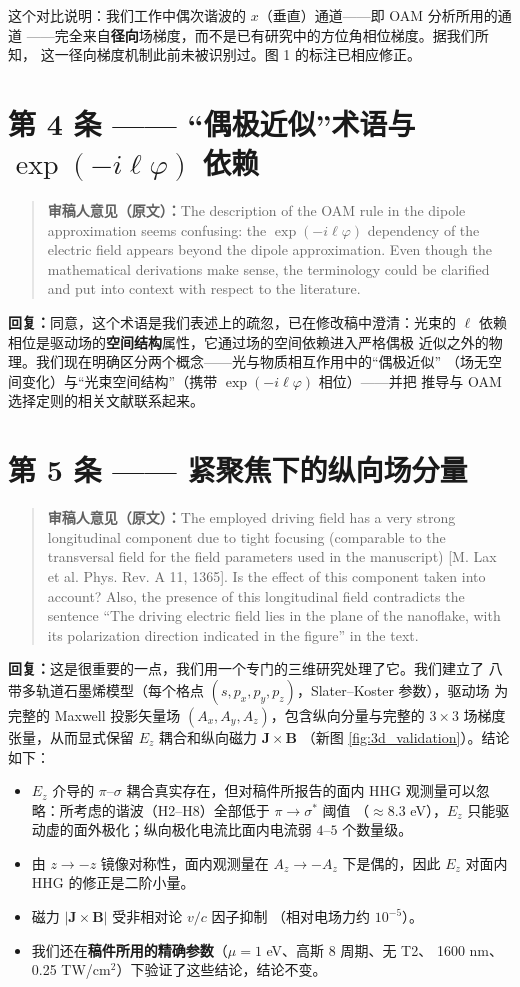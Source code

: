 \documentclass[11pt,a4paper]{ctexart}
\newcommand{\reviewer}[1]{\par\medskip\begin{quote}\small\color{gray!70!black}%
  \textbf{审稿人意见（原文）：}#1\end{quote}\medskip}
\newcommand{\response}{\par\medskip\textbf{回复：}}
\begin{document}
这个对比说明：我们工作中偶次谐波的 $x$（垂直）通道——即 OAM 分析所用的通道
——完全来自\textbf{径向}场梯度，而不是已有研究中的方位角相位梯度。据我们所知，
这一径向梯度机制此前未被识别过。图 1 的标注已相应修正。

\section*{第 4 条 —— ``偶极近似''术语与 $\exp(-i\ell\varphi)$ 依赖}

\reviewer{The description of the OAM rule in the dipole approximation seems
confusing: the $\exp(-i\ell\varphi)$ dependency of the electric field appears
beyond the dipole approximation. Even though the mathematical derivations make
sense, the terminology could be clarified and put into context with respect to
the literature.}

\response 同意，这个术语是我们表述上的疏忽，已在修改稿中澄清：光束的
$\ell$ 依赖相位是驱动场的\textbf{空间结构}属性，它通过场的空间依赖进入严格偶极
近似之外的物理。我们现在明确区分两个概念——光与物质相互作用中的``偶极近似''
（场无空间变化）与``光束空间结构''（携带 $\exp(-i\ell\varphi)$ 相位）——并把
推导与 OAM 选择定则的相关文献联系起来。

\section*{第 5 条 —— 紧聚焦下的纵向场分量}

\reviewer{The employed driving field has a very strong longitudinal component due
to tight focusing (comparable to the transversal field for the field parameters
used in the manuscript) [M. Lax et al. Phys. Rev. A 11, 1365]. Is the effect of
this component taken into account? Also, the presence of this longitudinal field
contradicts the sentence ``The driving electric field lies in the plane of the
nanoflake, with its polarization direction indicated in the figure'' in the text.}

\response 这是很重要的一点，我们用一个专门的三维研究处理了它。我们建立了
八带多轨道石墨烯模型（每个格点 $(s,p_x,p_y,p_z)$，Slater--Koster 参数），驱动场
为完整的 Maxwell 投影矢量场 $(A_x,A_y,A_z)$，包含纵向分量与完整的 $3\times3$
场梯度张量，从而显式保留 $E_z$ 耦合和纵向磁力 $\mathbf{J}\times\mathbf{B}$
（新图 \ref{fig:3d_validation}）。结论如下：

\begin{itemize}
  \item $E_z$ 介导的 $\pi$--$\sigma$ 耦合真实存在，但对稿件所报告的面内 HHG
  观测量可以忽略：所考虑的谐波（H2--H8）全部低于 $\pi\to\sigma^*$ 阈值
  （$\approx 8.3$ eV），$E_z$ 只能驱动虚的面外极化；纵向极化电流比面内电流弱
  $4$--$5$ 个数量级。
  \item 由 $z\to-z$ 镜像对称性，面内观测量在 $A_z\to-A_z$ 下是偶的，因此
  $E_z$ 对面内 HHG 的修正是二阶小量。
  \item 磁力 $|\mathbf{J}\times\mathbf{B}|$ 受非相对论 $v/c$ 因子抑制
  （相对电场力约 $10^{-5}$）。
  \item 我们还在\textbf{稿件所用的精确参数}（$\mu=1$ eV、高斯 8 周期、无 T2、
  1600 nm、0.25 TW/cm$^2$）下验证了这些结论，结论不变。
\end{itemize}
\end{document}
